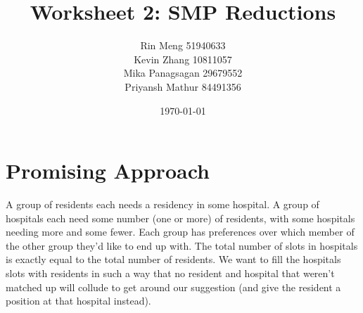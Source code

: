 \documentclass[12pt]{article}
\title{Worksheet 2: SMP Reductions}
\author{Rin Meng 51940633 \\ Kevin Zhang 10811057 \\ Mika Panagsagan 29679552 \\ Priyansh Mathur 84491356}
\date{\today}
\begin{document}
\maketitle

\setcounter{section}{5}

\section{Promising Approach}

A group of residents each needs a residency in some hospital. A group of hospitals each need some
number (one or more) of residents, with some hospitals needing more and some fewer. Each group has
preferences over which member of the other group they’d like to end up with. The total number of slots in
hospitals is exactly equal to the total number of residents.
We want to fill the hospitals slots with residents in such a way that no resident and hospital that
weren’t matched up will collude to get around our suggestion (and give the resident a position at that
hospital instead).
\end{document}
